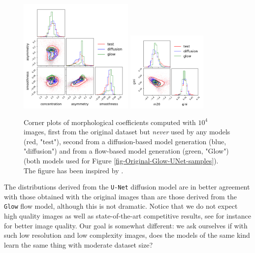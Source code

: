 \documentclass[11pt]{amsart}
\begin{document}
\begin{figure}
    \centering
		\includegraphics[width=0.5\textwidth]{fig-CAS-all.pdf}
		\includegraphics[width=0.35\textwidth]{fig-gini-m20-all.pdf}
	\caption{Corner plots \citep{corner2016} of morphological coefficients computed with $10^4$ images, first from the original dataset but \textit{never} used by any models (red, "test"), second from a diffusion-based model generation (blue, "diffusion") and from a flow-based model generation (green, "Glow") (both models used for Figure \ref{fig-Original-Glow-UNet-samples}). The figure has been inspired by \cite{HACKSTEIN2023100685}.}
	\label{fig-morpho-coeff}
\end{figure}
The distributions derived from the \texttt{U-Net} diffusion model are in better agreement with those obtained with the original images than are those derived from the \texttt{Glow} flow model, although this is not dramatic.
Notice that we do not expect high quality images as well as state-of-the-art competitive results, see for instance \citep{ravanbakhsh2016,Fussell2019,Lanusse2021,smith2021,HACKSTEIN2023100685} for better image quality. Our goal is somewhat different: we ask ourselves if with such low resolution and low complexity images, does the models of the same kind learn the same thing with moderate dataset size?
%
\end{document}
